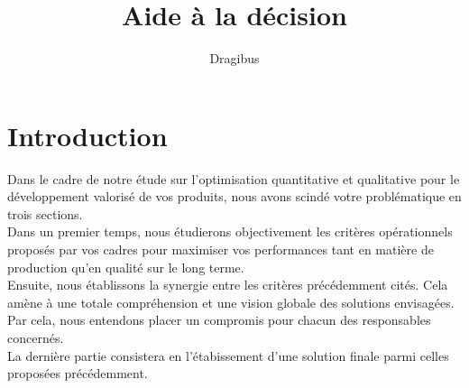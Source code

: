 \documentclass[a4paper, 11pt]{article}
\title{Aide à la décision}
\author{Dragibus}
\date{}
\begin{document}
\maketitle
\tableofcontents
\newpage

\section{Introduction}
Dans le cadre de notre étude sur l'optimisation quantitative et qualitative
pour le développement valorisé de vos produits, nous avons scindé votre
problématique en trois sections. \\
Dans un premier temps, nous étudierons objectivement les critères opérationnels
proposés par vos cadres pour maximiser vos performances tant en matière de
production qu'en qualité sur le long terme. \\
Ensuite, nous établissons la synergie entre les critères précédemment cités.
Cela amène à une totale compréhension et une vision globale des solutions
envisagées. Par cela, nous entendons placer un compromis pour chacun des
responsables concernés. \\
La dernière partie consistera en l'étabissement d'une solution finale parmi
celles proposées précédemment.
\end{document}
